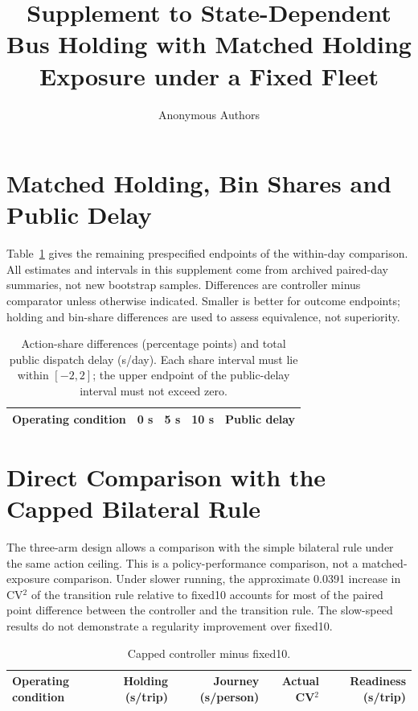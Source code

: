 \documentclass[10pt,journal,onecolumn]{IEEEtran}
\begin{document}
\title{Supplement to State-Dependent Bus Holding with Matched Holding Exposure under a Fixed Fleet}
\author{Anonymous Authors}
\maketitle
\setlength{\tabcolsep}{6pt}
\renewcommand{\arraystretch}{1.17}

\section{Matched Holding, Bin Shares and Public Delay}
Table~\ref{t:bins} gives the remaining prespecified endpoints of the
within-day comparison. All estimates and intervals in this supplement come
from archived paired-day summaries, not new bootstrap samples. Differences
are controller minus comparator unless otherwise indicated. Smaller is
better for outcome endpoints; holding and bin-share differences are used
to assess equivalence, not superiority.

\begin{table}[!ht]
\centering
\caption{Action-share differences (percentage points) and total public dispatch delay (s/day). Each share interval must lie within $[-2,2]$; the upper endpoint of the public-delay interval must not exceed zero.}
\label{t:bins}
\small
\begin{tabular}{@{}lrrrr@{}}
\toprule
Operating condition & 0 s & 5 s & 10 s & Public delay \\
\midrule

\end{tabular}
\end{table}

\section{Direct Comparison with the Capped Bilateral Rule}
The three-arm design allows a comparison with the simple bilateral rule
under the same action ceiling. This is a policy-performance comparison,
not a matched-exposure comparison. Under slower running, the approximate
0.0391 increase in CV$^2$ of the transition rule relative to fixed10
accounts for most of the paired point difference between the controller
and the transition rule. The slow-speed results do not demonstrate a
regularity improvement over fixed10.

\begin{table}[!ht]
\centering
\caption{Capped controller minus fixed10.}
\label{t:fixed}
\small
\begin{tabular}{@{}lrrrr@{}}
\toprule
Operating condition & Holding (s/trip) & Journey (s/person) & Actual CV$^2$ & Readiness (s/trip) \\
\midrule

\end{tabular}
\end{table}
\end{document}
